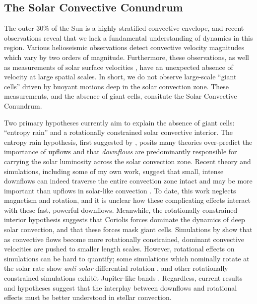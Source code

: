 \subsection{The Solar Convective Conundrum}
\label{sct:convective_conundrum}
The outer 30\% of the Sun is a highly stratified convective envelope, and recent observations reveal that we lack a fundamental understanding of dynamics in this region.
Various helioseismic observations \citep{hanasoge&all2012, greer&all2015} detect convective velocity magnitudes which vary by two orders of magnitude.
Furthermore, these observations, as well as measurements of solar surface velocities \citep{hathaway&all2015}, have an unexpected absence of velocity at large spatial scales.
In short, we do not observe large-scale ``giant cells'' driven by buoyant motions deep in the solar convection zone.
These measurements, and the absence of giant cells, consitute the Solar Convective Conundrum.

Two primary hypotheses currently aim to explain the absence of giant cells: ``entropy rain'' and a rotationally constrained solar convective interior.
The entropy rain hypothesis, first suggested by \cite{spruit1997}, posits many theories over-predict the importance of upflows and that \emph{downflows} are predominantly responsible for carrying the solar luminosity across the solar convection zone.
Recent theory and simulations, including some of my own work, suggest that small, intense downflows can indeed traverse the entire convection zone intact and may be more important than upflows in solar-like convection \citep{brandenburg2016, kapyla&all2017, andersLB2019}.
To date, this work neglects magnetism and rotation, and it is unclear how these complicating effects interact with these fast, powerful downflows.
Meanwhile, the rotationally constrained interior hypothesis suggests that Coriolis forces dominate the dynamics of deep solar convection, and that these forces mask giant cells.
Simulations by \cite{featherstone&hindman2016a, featherstone&hindman2016b} show that as convective flows become more rotationally constrained, dominant convective velocities are pushed to smaller length scales.
However, rotational effects on simulations can be hard to quantify; some simulations which nominally rotate at the solar rate show \emph{anti-solar} differential rotation \citep{gastine&all2014}, and other rotationally constrained simulations exhibit Jupiter-like bands \citep{brun&all2017}.
Regardless, current results and hypotheses suggest that the interplay between downflows and rotational effects must be better understood in stellar convection.

